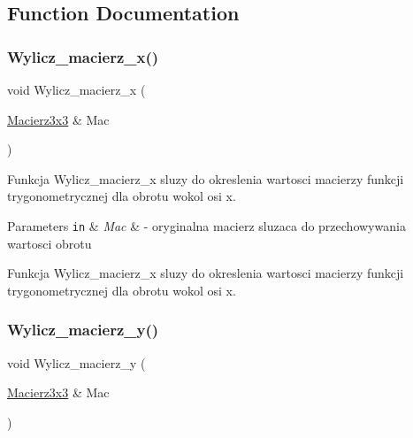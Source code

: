 \subsection{Function Documentation}
\mbox{\label{Macierz3x3_8hh_a28670d7aba1ee76534fe5762b3b747b6}} 
\subsubsection{\texorpdfstring{Wylicz\+\_\+macierz\+\_\+x()}{Wylicz\_macierz\_x()}}
{\footnotesize\ttfamily void Wylicz\+\_\+macierz\+\_\+x (\begin{DoxyParamCaption}\item[{\hyperlink{classMacierz}{Macierz3x3} \&}]{Mac }\end{DoxyParamCaption})}



Funkcja Wylicz\+\_\+macierz\+\_\+x sluzy do okreslenia wartosci macierzy funkcji trygonometrycznej dla obrotu wokol osi x. 


\begin{DoxyParams}[1]{Parameters}
\mbox{\tt in}  & {\em Mac} & -\/ oryginalna macierz sluzaca do przechowywania wartosci obrotu\\
\hline
\end{DoxyParams}
Funkcja Wylicz\+\_\+macierz\+\_\+x sluzy do okreslenia wartosci macierzy funkcji trygonometrycznej dla obrotu wokol osi x. \mbox{\label{Macierz3x3_8hh_aaf1ca1069eac4e0e1d9b093a31ea5003}} 
\subsubsection{\texorpdfstring{Wylicz\+\_\+macierz\+\_\+y()}{Wylicz\_macierz\_y()}}
{\footnotesize\ttfamily void Wylicz\+\_\+macierz\+\_\+y (\begin{DoxyParamCaption}\item[{\hyperlink{classMacierz}{Macierz3x3} \&}]{Mac }\end{DoxyParamCaption})}



